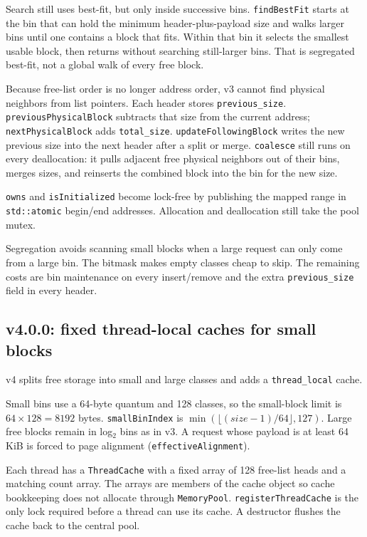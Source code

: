 Search still uses best-fit, but only inside successive bins.
\texttt{findBestFit} starts at the bin that can hold the minimum header-plus-payload
size and walks larger bins until one contains a block that fits.
Within that bin it selects the smallest usable block, then returns without
searching still-larger bins.
That is segregated best-fit, not a global walk of every free block.

Because free-list order is no longer address order, v3 cannot find physical
neighbors from list pointers.
Each header stores \texttt{previous\_size}.
\texttt{previousPhysicalBlock} subtracts that size from the current address;
\texttt{nextPhysicalBlock} adds \texttt{total\_size}.
\texttt{updateFollowingBlock} writes the new previous size into the next header
after a split or merge.
\texttt{coalesce} still runs on every deallocation: it pulls adjacent free
physical neighbors out of their bins, merges sizes, and reinserts the combined
block into the bin for the new size.

\texttt{owns} and \texttt{isInitialized} become lock-free by publishing the
mapped range in \texttt{std::atomic} begin/end addresses.
Allocation and deallocation still take the pool mutex.

Segregation avoids scanning small blocks when a large request can only come
from a large bin.
The bitmask makes empty classes cheap to skip.
The remaining costs are bin maintenance on every insert/remove and the extra
\texttt{previous\_size} field in every header.

\subsection{v4.0.0: fixed thread-local caches for small blocks}

v4 splits free storage into small and large classes and adds a
\texttt{thread\_local} cache.

Small bins use a 64-byte quantum and 128 classes, so the small-block limit is
$64 \times 128 = 8192$ bytes.
\texttt{smallBinIndex} is $\min(\lfloor (size-1)/64 \rfloor, 127)$.
Large free blocks remain in log$_2$ bins as in v3.
A request whose payload is at least 64\,KiB is forced to page alignment
(\texttt{effectiveAlignment}).

Each thread has a \texttt{ThreadCache} with a fixed array of 128 free-list heads
and a matching count array.
The arrays are members of the cache object so cache bookkeeping does not
allocate through \texttt{MemoryPool}.
\texttt{registerThreadCache} is the only lock required before a thread can use
its cache.
A destructor flushes the cache back to the central pool.

